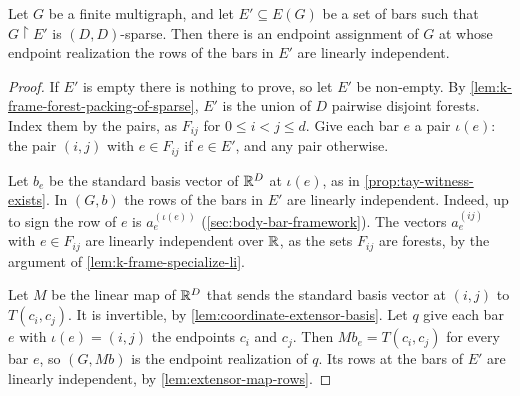 \begin{lemma}
  \label{lem:endpoint-witness}
  \leanok
  Let $G$ be a finite multigraph, and let $E' \subseteq E(G)$ be a set
  of bars such that $G \restriction E'$ is $(D, D)$-sparse. Then there
  is an endpoint assignment of $G$ at whose endpoint realization the
  rows of the bars in $E'$ are linearly independent.
\end{lemma}
\begin{proof}
  \leanok
  If $E'$ is empty there is nothing to prove, so let $E'$ be
  non-empty. By \cref{lem:k-frame-forest-packing-of-sparse}, $E'$ is
  the union of $D$ pairwise disjoint forests. Index them by the pairs,
  as $F_{ij}$ for $0 \le i < j \le d$. Give each bar $e$ a
  pair $\iota(e)$: the pair $(i, j)$ with $e \in F_{ij}$ if
  $e \in E'$, and any pair otherwise.

  Let $b_e$ be the standard basis vector of ${\mathbb{R}}^D$ at $\iota(e)$, as
  in \cref{prop:tay-witness-exists}. In $(G, b)$ the rows of the bars
  in $E'$ are linearly independent. Indeed, up to sign the row of $e$
  is $a_e^{(\iota(e))}$ (\cref{sec:body-bar-framework}). The vectors
  $a_e^{(ij)}$ with $e \in F_{ij}$ are linearly independent over ${\mathbb{R}}$,
  as the sets $F_{ij}$ are forests, by the argument of
  \cref{lem:k-frame-specialize-li}.

  Let $M$ be the linear map of ${\mathbb{R}}^D$ that sends the standard basis
  vector at $(i, j)$ to $T(c_i, c_j)$. It is invertible, by
  \cref{lem:coordinate-extensor-basis}. Let $q$ give each bar $e$ with
  $\iota(e) = (i, j)$ the endpoints $c_i$ and $c_j$. Then
  $M b_e = T(c_i, c_j)$ for every bar $e$, so $(G, Mb)$ is the
  endpoint realization of $q$. Its rows at the bars of $E'$ are
  linearly independent, by \cref{lem:extensor-map-rows}.
\end{proof}

